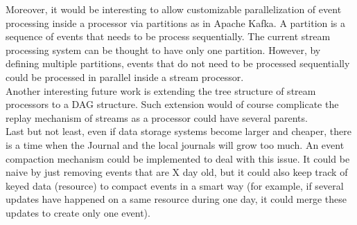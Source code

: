 Moreover, it would be interesting to allow customizable parallelization of event processing inside a processor via partitions as in Apache Kafka. A partition is a sequence of events that needs to be process sequentially. The current stream processing system can be thought to have only one partition. However, by defining multiple partitions, events that do not need to be processed sequentially could be processed in parallel inside a stream processor.
\\

Another interesting future work is extending the tree structure of stream processors to a DAG structure. Such extension would of course complicate the replay mechanism of streams as a processor could have several parents.
\\

Last but not least, even if data storage systems become larger and cheaper, there is a time when the Journal and the local journals will grow too much. An event compaction mechanism could be implemented to deal with this issue. It could be naive by just removing events that are X day old, but it could also keep track of keyed data (resource) to compact events in a smart way (for example, if several updates have happened on a same resource during one day, it could merge these updates to create only one event).



